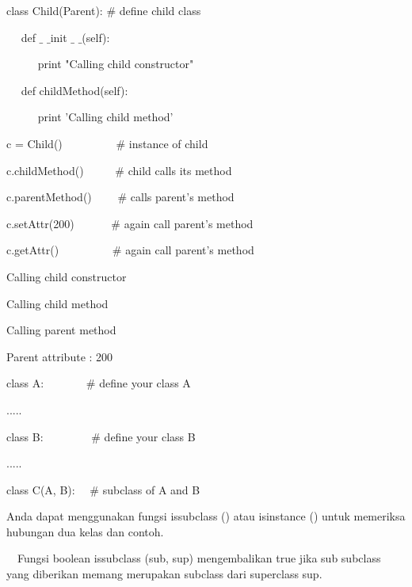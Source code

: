 \documentclass[a4paper,12pt]{report}
\begin{document}
\vspace{12pt}
\noindent 
class Child(Parent):  $  \#  $ define child class \par
\noindent 
~~ def  $  \_  $ $  \_  $init $  \_  $ $  \_  $(self): \par
\noindent 
~~~~~ print "Calling child constructor" \par
\vspace{12pt}
\noindent 
~~ def childMethod(self): \par
\noindent 
~~~~~ print 'Calling child method' \par
\vspace{12pt}
\noindent 
c = Child()~~~~~~~~~  $  \#  $ instance of child \par
\noindent 
c.childMethod()~~~~~  $  \#  $ child calls its method \par
\noindent 
c.parentMethod()~~~~  $  \#  $ calls parent's method \par
\noindent 
c.setAttr(200)~~~~~~  $  \#  $ again call parent's method \par
\noindent 
c.getAttr()~~~~~~~~~  $  \#  $ again call parent's method \par
\vspace{14pt}
\noindent 
Calling child constructor \par
\noindent 
Calling child method \par
\noindent 
Calling parent method \par
\noindent 
Parent attribute : 200 \par
\vspace{14pt}
\noindent 
class A:~~~~~~~  $  \#  $ define your class A \par
\noindent 
..... \par
\vspace{12pt}
\noindent 
class B:~~~~~~~~  $  \#  $ define your class B \par
\noindent 
..... \par
\vspace{12pt}
\noindent 
class C(A, B):~~  $  \#  $ subclass of A and B \par
\noindent 
Anda dapat menggunakan fungsi issubclass () atau isinstance () untuk memeriksa hubungan dua kelas dan contoh. \par
\vspace{12pt}
\noindent 
 $  $ $  $ $  $ $  $Fungsi boolean issubclass (sub, sup) mengembalikan true jika sub subclass yang diberikan memang merupakan subclass dari superclass sup. \par
\vspace{12pt}
\end{document}
